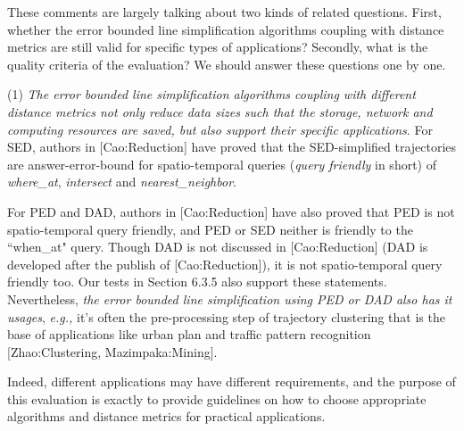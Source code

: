 \documentclass{letter}
\newcommand{\ie}{\emph{i.e.,}\xspace}
\newcommand{\eg}{\emph{e.g.,}\xspace}
\begin{document}
These comments are largely talking about two kinds of related questions. First, whether the error bounded line simplification algorithms coupling with distance metrics are still valid for specific types of applications? Secondly, what is the quality criteria of the evaluation? We should answer these questions one by one.

(1) \emph{The error bounded line simplification algorithms coupling with different distance metrics not only reduce data sizes such that the storage, network and computing resources are saved, but also support their specific applications}. For SED, authors in [Cao:Reduction] have proved that the SED-simplified trajectories are answer-error-bound for spatio-temporal queries (\emph{query friendly} in short) of \emph{where\_at}, \emph{intersect} and \emph{nearest\_neighbor}.  %

For PED and DAD, authors in [Cao:Reduction] have also proved that PED is not spatio-temporal query friendly, and PED or SED neither is friendly to the ``when\_at" query. Though DAD is not discussed in [Cao:Reduction] (DAD is developed after the publish of [Cao:Reduction]), it is not spatio-temporal query friendly too. Our tests in Section 6.3.5 also support these statements. Nevertheless, \emph{the error bounded line simplification using PED or DAD also has it usages}, \eg it's often the pre-processing step of trajectory clustering that is the base of applications like urban plan and traffic pattern recognition [Zhao:Clustering, Mazimpaka:Mining]. %


Indeed, different applications may have different requirements, and the purpose of this evaluation is exactly to provide guidelines on how to choose appropriate algorithms and distance metrics for practical applications.
\end{document}
